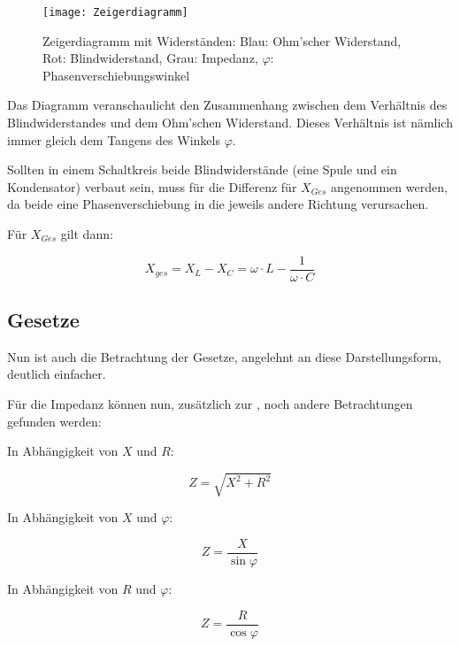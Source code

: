\begin{figure}[h!]
	\centering
	\texttt{[image: Zeigerdiagramm]}
	\caption{Zeigerdiagramm mit Widerständen: Blau: Ohm'scher Widerstand, Rot: Blindwiderstand, Grau: Impedanz, $\varphi$: Phasenverschiebungswinkel}
\end{figure}

Das Diagramm veranschaulicht den Zusammenhang zwischen dem Verhältnis des Blindwiderstandes und dem Ohm'schen Widerstand. Dieses Verhältnis ist nämlich immer gleich dem Tangens des Winkels $\varphi$.

\begin{Anmerkung}
Sollten in einem Schaltkreis beide Blindwiderstände (eine Spule und ein Kondensator) verbaut sein, muss für die Differenz für $X_{Ges}$ angenommen werden, da beide eine Phasenverschiebung in die jeweils andere Richtung verursachen.
\end{Anmerkung}

\noindent Für $X_{Ges}$ gilt dann:

\begin{equation}	\label{eq:BlindwiderstandSumme}
	X_{ges} = X_L - X_C = \omega \cdot L - \frac{1}{\omega \cdot C}
\end{equation}



\subsection{Gesetze}	\label{subsec:WiderstaendeGesetzte}

Nun ist auch die Betrachtung der Gesetze, angelehnt an diese Darstellungsform, deutlich einfacher.


Für die Impedanz können nun, zusätzlich zur , noch andere Betrachtungen gefunden werden:

In Abhängigkeit von $X$ und $R$:

\begin{equation}	\label{eq:ImepdanzXR}
	Z = \sqrt{X^2 + R^2}
\end{equation}


\noindent In Abhängigkeit von $X$ und $\varphi$:

\begin{equation}	\label{eq:ImepdanzXphi}
	Z = \frac{X}{\sin\varphi}
\end{equation}


\noindent In Abhängigkeit von $R$ und $\varphi$:

\begin{equation}	\label{eq:ImepdanzRphi}
	Z = \frac{R}{\cos\varphi}
\end{equation}












